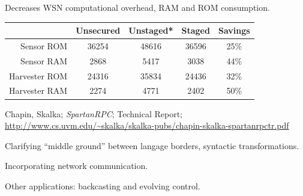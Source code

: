 Decreases WSN computational overhead, RAM and ROM consumption. 
\stopslide


\begin{center}
\begin{tabular}{|r||c|c|c|c|} \hline
              & Unsecured & Unstaged* & Staged & Savings\\ \hline
Sensor ROM    &     36254 &    48616 &  36596 & 25\% \\
Sensor RAM    &      2868 &     5417 &   3038 & 44\% \\ \hline
Harvester ROM &     24316 &    35834 &  24436 & 32\% \\
Harvester RAM &      2274 &     4771 &   2402 & 50\% \\ \hline
\end{tabular}
\end{center}

{\small * Chapin, Skalka; \textit{SpartanRPC}; Technical Report;
  \url{http://www.cs.uvm.edu/~skalka/skalka-pubs/chapin-skalka-spartanrpctr.pdf}}
\stopslide


\begin{citemize}
\item Clarifying ``middle ground'' between langage borders, syntactic transformations.
\item Incorporating network communication. 
\item Other applications: backcasting and evolving control.
\end{citemize}
\stopslide


\makeatletter
{}
\makeatother
\stopslide
